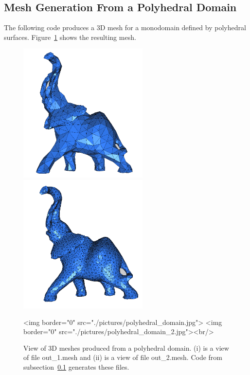 \subsection{Mesh Generation From a Polyhedral Domain}
\label{Mesh_3_subsection_examples_polyhedral}
The following code produces a 3D mesh for a monodomain
defined by polyhedral surfaces. Figure~\ref{figure:polyhedral_domain}
shows the resulting mesh.


\begin{figure}[ht]
\begin{center}
 \begin{ccTexOnly}
   \includegraphics[height=7cm]{Mesh_3/pictures/polyhedral_domain}
   \includegraphics[height=7cm]{Mesh_3/pictures/polyhedral_domain_2}
 \end{ccTexOnly}
 \begin{ccHtmlOnly}
   <img border="0" src="./pictures/polyhedral_domain.jpg">
   <img border="0" src="./pictures/polyhedral_domain_2.jpg"><br/>
 \end{ccHtmlOnly}
 \caption{View of 3D meshes produced from a polyhedral domain. (i) 
   is a view of file out\_1.mesh and (ii) is a view of file
   out\_2.mesh. Code from
   subsection~\ref{Mesh_3_subsection_examples_polyhedral} generates
   these files.}
  \label{figure:polyhedral_domain}
\end{center}
\end{figure}


